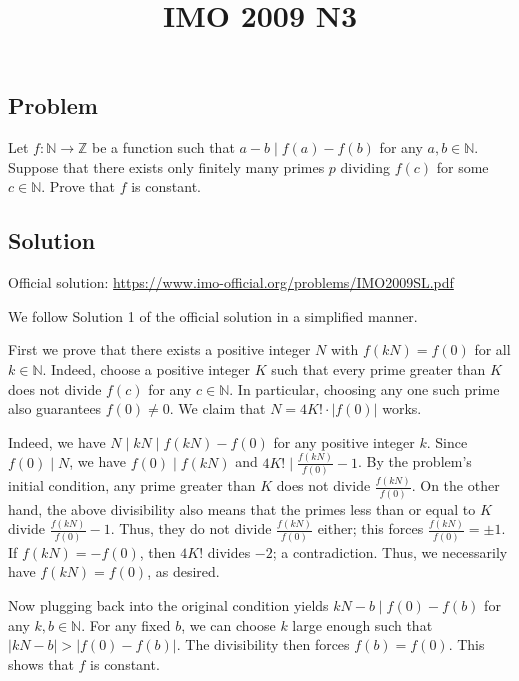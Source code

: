 \documentclass{article}
\title{IMO 2009 N3}
\author{}
\date{}
\newcommand{\N}{\mathbb{N}}
\newcommand{\Z}{\mathbb{Z}}
\begin{document}
\maketitle



\subsection*{Problem}

Let $f : \N \to \Z$ be a function such that $a - b \mid f(a) - f(b)$ for any $a, b \in \N$.
Suppose that there exists only finitely many primes $p$ dividing $f(c)$ for some $c \in \N$.
Prove that $f$ is constant.



\subsection*{Solution}

Official solution: \url{https://www.imo-official.org/problems/IMO2009SL.pdf}

We follow Solution 1 of the official solution in a simplified manner.

First we prove that there exists a positive integer $N$ with $f(kN) = f(0)$ for all $k \in \N$.
Indeed, choose a positive integer $K$ such that every prime greater than $K$ does not divide $f(c)$ for any $c \in \N$.
In particular, choosing any one such prime also guarantees $f(0) \neq 0$.
We claim that $N = 4K! \cdot |f(0)|$ works.

Indeed, we have $N \mid kN \mid f(kN) - f(0)$ for any positive integer $k$.
Since $f(0) \mid N$, we have $f(0) \mid f(kN)$ and $4K! \mid \frac{f(kN)}{f(0)} - 1$.
By the problem's initial condition, any prime greater than $K$ does not divide $\frac{f(kN)}{f(0)}$.
On the other hand, the above divisibility also means that the primes less than or equal to $K$ divide $\frac{f(kN)}{f(0)} - 1$.
Thus, they do not divide $\frac{f(kN)}{f(0)}$ either; this forces $\frac{f(kN)}{f(0)} = \pm 1$.
If $f(kN) = -f(0)$, then $4K!$ divides $-2$; a contradiction.
Thus, we necessarily have $f(kN) = f(0)$, as desired.

Now plugging back into the original condition yields $kN - b \mid f(0) - f(b)$ for any $k, b \in \N$.
For any fixed $b$, we can choose $k$ large enough such that $|kN - b| > |f(0) - f(b)|$.
The divisibility then forces $f(b) = f(0)$.
This shows that $f$ is constant.
\end{document}
